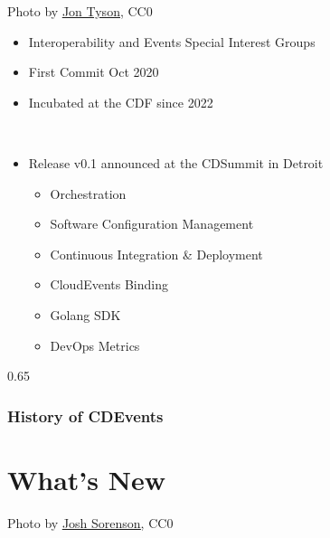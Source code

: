 \documentclass[aspectratio=169,11pt,hyperref={colorlinks=true}]{beamer}
\begin{document}
\begin{lgrayframerpic}{%
  Photo by \href{https://unsplash.com/@jontyson}{\underline{Jon Tyson}}, CC0
  }%
  {%
  \begin{itemize}
    \item Interoperability and Events Special Interest Groups
    \item First Commit Oct 2020 
    \item Incubated at the CDF since 2022
  \end{itemize}
  ~\\
  \begin{itemize}
    \item Release v0.1 announced at the CDSummit in Detroit
    \begin{itemize}
      \item Orchestration
      \item Software Configuration Management
      \item Continuous Integration \& Deployment
      \item CloudEvents Binding
      \item Golang SDK
      \item DevOps Metrics
    \end{itemize}
  \end{itemize}
  }%
  {0.65}
  \frametitle{History of CDEvents}
\end{lgrayframerpic}

\section{What's New}
\begin{sectionwithpiclargecentral}{Photo by \href{https://unsplash.com/@joshsorenson}{\underline{Josh Sorenson}}, CC0}
\end{sectionwithpiclargecentral}
\end{document}
